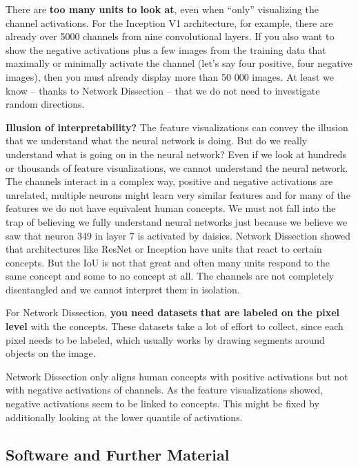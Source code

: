 \documentclass[
  10pt,
]{scrbook}
\begin{document}
There are \textbf{too many units to look at}, even when ``only'' visualizing the channel activations.
For the Inception V1 architecture, for example, there are already over 5000 channels from nine convolutional layers.
If you also want to show the negative activations plus a few images from the training data that maximally or minimally activate the channel (let's say four positive, four negative images), then you must already display more than 50 000 images.
At least we know -- thanks to Network Dissection -- that we do not need to investigate random directions.

\textbf{Illusion of interpretability?}
The feature visualizations can convey the illusion that we understand what the neural network is doing.
But do we really understand what is going on in the neural network?
Even if we look at hundreds or thousands of feature visualizations, we cannot understand the neural network.
The channels interact in a complex way, positive and negative activations are unrelated, multiple neurons might learn very similar features and for many of the features we do not have equivalent human concepts.
We must not fall into the trap of believing we fully understand neural networks just because we believe we saw that neuron 349 in layer 7 is activated by daisies.
Network Dissection showed that architectures like ResNet or Inception have units that react to certain concepts.
But the IoU is not that great and often many units respond to the same concept and some to no concept at all.
The channels are not completely disentangled and we cannot interpret them in isolation.

For Network Dissection, \textbf{you need datasets that are labeled on the pixel level} with the concepts.
These datasets take a lot of effort to collect, since each pixel needs to be labeled, which usually works by drawing segments around objects on the image.

Network Dissection only aligns human concepts with positive activations but not with negative activations of channels.
As the feature visualizations showed, negative activations seem to be linked to concepts.
This might be fixed by additionally looking at the lower quantile of activations.

\hypertarget{software-and-further-material}{%
\subsection{Software and Further Material}\label{software-and-further-material}}
\end{document}
